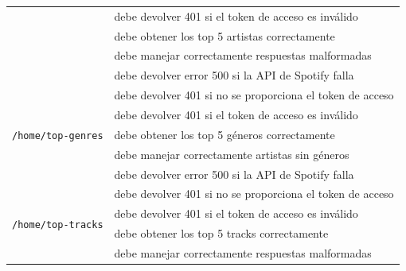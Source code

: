 \begin{longtable}{|p{5cm}|p{9cm}|}
                                                        & debe devolver 401 si el token de acceso es inválido                                      \\ \cline{2-2}
                                                        & debe obtener los top 5 artistas correctamente                                            \\ \cline{2-2}
                                                        & debe manejar correctamente respuestas malformadas                                        \\ \cline{2-2}
                                                        & debe devolver error 500 si la API de Spotify falla                                       \\ \hline
  \multirow{5}{*}{\texttt{/home/top-genres}}            & debe devolver 401 si no se proporciona el token de acceso                                \\ \cline{2-2}
                                                        & debe devolver 401 si el token de acceso es inválido                                      \\ \cline{2-2}
                                                        & debe obtener los top 5 géneros correctamente                                             \\ \cline{2-2}
                                                        & debe manejar correctamente artistas sin géneros                                          \\ \cline{2-2}
                                                        & debe devolver error 500 si la API de Spotify falla                                       \\ \hline
  \multirow{5}{*}{\texttt{/home/top-tracks}}            & debe devolver 401 si no se proporciona el token de acceso                                \\ \cline{2-2}
                                                        & debe devolver 401 si el token de acceso es inválido                                      \\ \cline{2-2}
                                                        & debe obtener los top 5 tracks correctamente                                              \\ \cline{2-2}
                                                        & debe manejar correctamente respuestas malformadas                                        \\ \cline{2-2}

\end{longtable}
